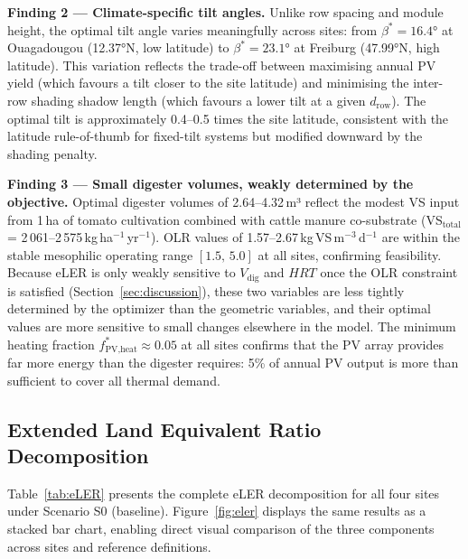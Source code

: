 \textbf{Finding 2 --- Climate-specific tilt angles.} Unlike row
spacing and module height, the optimal tilt angle varies meaningfully
across sites: from $\beta^* = 16.4$° at Ouagadougou (12.37°N, low
latitude) to $\beta^* = 23.1$° at Freiburg (47.99°N, high latitude).
This variation reflects the trade-off between maximising annual PV
yield (which favours a tilt closer to the site latitude) and
minimising the inter-row shading shadow length (which favours a
lower tilt at a given $d_{\text{row}}$). The optimal tilt is
approximately 0.4--0.5 times the site latitude, consistent with
the latitude rule-of-thumb for fixed-tilt systems but modified
downward by the shading penalty.

\textbf{Finding 3 --- Small digester volumes, weakly determined by
	the objective.} Optimal digester volumes of 2.64--4.32\,m³
reflect the modest VS input from 1\,ha of tomato cultivation combined
with cattle manure co-substrate
(VS$_{\text{total}}$ = 2\,061--2\,575\,kg\,ha$^{-1}$\,yr$^{-1}$).
OLR values of 1.57--2.67\,kg\,VS\,m$^{-3}$\,d$^{-1}$ are within
the stable mesophilic operating range $[1.5,\,5.0]$ at all sites,
confirming feasibility. Because eLER is only weakly sensitive to
$V_{\text{dig}}$ and $HRT$ once the OLR constraint is satisfied
(Section~\ref{sec:discussion}), these two variables are less tightly
determined by the optimizer than the geometric variables, and their
optimal values are more sensitive to small changes elsewhere in the
model. The minimum heating fraction
$f_{\text{PV,heat}}^* \approx 0.05$ at all sites confirms that
the PV array provides far more energy than the digester requires:
5\% of annual PV output is more than sufficient to cover all
thermal demand.

\subsection{Extended Land Equivalent Ratio Decomposition}
\label{sec:results_eler}

\hspace{1cm}Table~\ref{tab:eLER} presents the complete eLER decomposition
for all four sites under Scenario S0 (baseline). Figure~\ref{fig:eler}
displays the same results as a stacked bar chart, enabling direct visual
comparison of the three components across sites and reference definitions.

